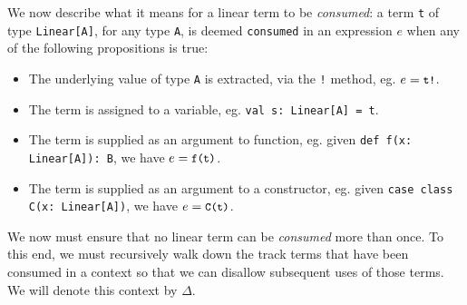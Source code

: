 \documentclass[a4paper,twoside]{article}
\newcommand{\TODO}[1]{\textcolor{YellowOrange}{(TODO: #1)}} %
\newcommand{\RefFig}[1]{Figure~\ref{#1}}
\newcommand{\stt}[1]{\texttt{\small{#1}}}
\begin{document}
We now describe what it means for a linear term to be \textit{consumed}: a term \stt{t} of type \stt{Linear[A]}, for any type \stt{A}, is deemed \stt{consumed} in an expression $e$ when any of the following propositions is true:

\begin{itemize}
\item The underlying value of type \stt{A} is extracted, via the \stt{!} method, eg. $e = \stt{t!}$.
\item The term is assigned to a variable, eg. \stt{val s:\,Linear[A] = t}.
\item The term is supplied as an argument to function, eg. given \stt{def f(x:\,Linear[A]):\,B}, we have $e = \stt{f(t)}$.
\item The term is supplied as an argument to a constructor, eg. given \stt{case class C(x: Linear[A])}, we have $e = \stt{C(t)}$.
\end{itemize}


We now must ensure that no linear term can be \textit{consumed} more than once. To this end, we must recursively walk down the  track terms that have been consumed in a context so that we can disallow subsequent uses of those terms. We will denote this context by $\Delta$.

%
% 
%
%
%
\end{document}

